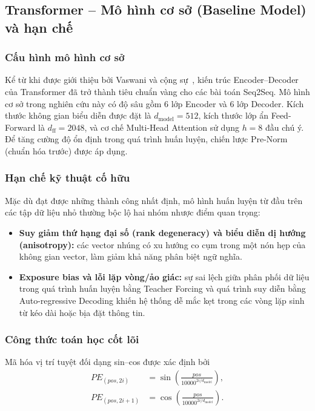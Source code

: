 \documentclass[11pt,a4paper]{article}
\numberwithin{equation}{section}
\begin{document}
\subsection{Transformer -- Mô hình cơ sở (Baseline Model) và hạn chế}

\subsubsection{Cấu hình mô hình cơ sở}

Kể từ khi được giới thiệu bởi Vaswani và cộng sự~\cite{vaswani2017attention}, kiến trúc Encoder--Decoder của Transformer đã trở thành tiêu chuẩn vàng cho các bài toán Seq2Seq. Mô hình cơ sở trong nghiên cứu này có độ sâu gồm 6 lớp Encoder và 6 lớp Decoder. Kích thước không gian biểu diễn được đặt là $d_{\text{model}}=512$, kích thước lớp ẩn Feed-Forward là $d_{\text{ff}}=2048$, và cơ chế Multi-Head Attention sử dụng $h=8$ đầu chú ý. Để tăng cường độ ổn định trong quá trình huấn luyện, chiến lược Pre-Norm (chuẩn hóa trước) được áp dụng.

\subsubsection{Hạn chế kỹ thuật cố hữu}

Mặc dù đạt được những thành công nhất định, mô hình huấn luyện từ đầu trên các tập dữ liệu nhỏ thường bộc lộ hai nhóm nhược điểm quan trọng:

\begin{itemize}
  \item \textbf{Suy giảm thứ hạng đại số (rank degeneracy) và biểu diễn dị hướng (anisotropy):} các vector nhúng có xu hướng co cụm trong một nón hẹp của không gian vector, làm giảm khả năng phân biệt ngữ nghĩa.
  \item \textbf{Exposure bias và lỗi lặp vòng/ảo giác:} sự sai lệch giữa phân phối dữ liệu trong quá trình huấn luyện bằng Teacher Forcing và quá trình suy diễn bằng Auto-regressive Decoding khiến hệ thống dễ mắc kẹt trong các vòng lặp sinh từ kéo dài hoặc bịa đặt thông tin.
\end{itemize}

\subsubsection{Công thức toán học cốt lõi}

Mã hóa vị trí tuyệt đối dạng sin--cos được xác định bởi
\begin{align}
PE_{(pos,2i)}
  &= \sin\left(\frac{pos}{10000^{2i/d_{\text{model}}}}\right),
  \label{eq:sin-pe}\\
PE_{(pos,2i+1)}
  &= \cos\left(\frac{pos}{10000^{2i/d_{\text{model}}}}\right).
  \label{eq:cos-pe}
\end{align}
\end{document}
